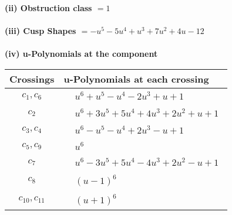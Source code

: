 \documentclass[1p]{elsarticle_modified}
\theoremstyle{definition}
\begin{document}
\flushleft \textbf{(ii) Obstruction class $= 1$}\\~\\
\flushleft \textbf{(iii) Cusp Shapes $= - u^5-5 u^4+u^3+7 u^2+4 u-12$}\\~\\
\newpage\renewcommand{\arraystretch}{1}
\flushleft \textbf{(iv) u-Polynomials at the component}\newline \\
\begin{tabular}{m{50pt}|m{274pt}}
Crossings & \hspace{64pt}u-Polynomials at each crossing \\
\hline $$\begin{aligned}c_{1},c_{6}\end{aligned}$$&$\begin{aligned}
&u^6+u^5- u^4-2 u^3+u+1
\end{aligned}$\\
\hline $$\begin{aligned}c_{2}\end{aligned}$$&$\begin{aligned}
&u^6+3 u^5+5 u^4+4 u^3+2 u^2+u+1
\end{aligned}$\\
\hline $$\begin{aligned}c_{3},c_{4}\end{aligned}$$&$\begin{aligned}
&u^6- u^5- u^4+2 u^3- u+1
\end{aligned}$\\
\hline $$\begin{aligned}c_{5},c_{9}\end{aligned}$$&$\begin{aligned}
&u^6
\end{aligned}$\\
\hline $$\begin{aligned}c_{7}\end{aligned}$$&$\begin{aligned}
&u^6-3 u^5+5 u^4-4 u^3+2 u^2- u+1
\end{aligned}$\\
\hline $$\begin{aligned}c_{8}\end{aligned}$$&$\begin{aligned}
&(u-1)^6
\end{aligned}$\\
\hline $$\begin{aligned}c_{10},c_{11}\end{aligned}$$&$\begin{aligned}
&(u+1)^6
\end{aligned}$\\
\hline
\end{tabular}\\~\\
\end{document}
